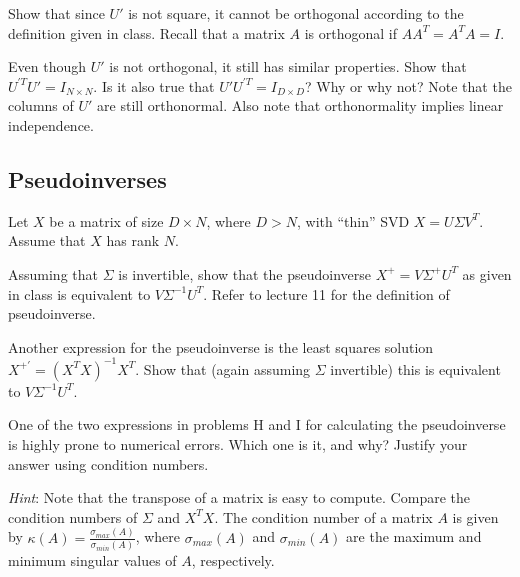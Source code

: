 \problem[3] Show that since $U'$ is not square, it cannot be orthogonal according to the definition given in class. Recall that a matrix $A$ is orthogonal if $A A^T = A^T A = I$.

\begin{solution}


\end{solution} 

\problem[4] Even though $U'$ is not orthogonal, it still has similar properties. Show that $U^{'T} U' = I_{N \times N}$. Is it also true that $U' U^{'T} = I_{D \times D}$? Why or why not? Note that the columns of $U'$ are still orthonormal. Also note that orthonormality implies linear independence.

\begin{solution}

\end{solution}

\subsection{Pseudoinverses} Let $X$ be a matrix of size $D \times N$, where $D > N$, with ``thin'' SVD $X = U\Sigma V^T$. Assume that $X$ has rank $N$.

\problem[4] Assuming that $\Sigma$ is invertible, show that the pseudoinverse $X^+ = V\Sigma^+ U^T$ as given in class is equivalent to $V\Sigma^{-1} U^T$. Refer to lecture 11 for the definition of pseudoinverse.

\begin{solution}


\end{solution}

\problem[4] Another expression for the pseudoinverse is the least squares solution $X^{+'} = (X^T X)^{-1}X^T$. Show that (again assuming $\Sigma$ invertible) this is equivalent to $V\Sigma^{-1}U^T$.

\begin{solution}


\end{solution}

\problem[2] One of the two expressions in problems H and I for calculating the pseudoinverse is highly prone to numerical errors. Which one is it, and why? Justify your answer using condition numbers.

\textit{Hint}: Note that the transpose of a matrix is easy to compute. Compare the condition numbers of $\Sigma$ and $X^T X$. The condition number of a matrix $A$ is given by $\kappa(A) = \frac{\sigma_{max}(A)}{\sigma_{min}(A)}$, where $\sigma_{max}(A)$ and $\sigma_{min}(A)$ are the maximum and minimum singular values of $A$, respectively.

